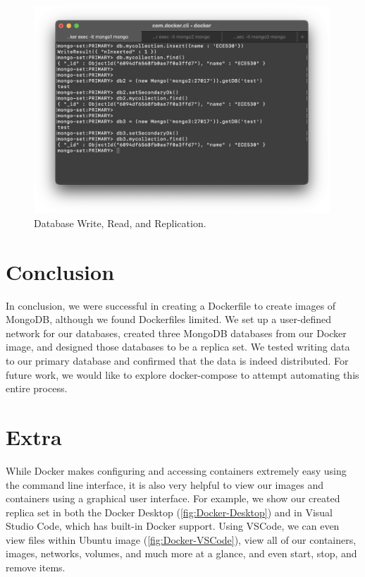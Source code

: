 \documentclass{article}
\begin{document}
\begin{figure}[ht]
    \centering
    \includegraphics[width=0.99\textwidth]{Docker-Write-Read.png}
    \vspace{-3em}\caption{Database Write, Read, and Replication.}
    \label{fig:Docker-Write-Read}
\end{figure}

\section{Conclusion}
In conclusion, we were successful in creating a Dockerfile to create images of MongoDB, although we found Dockerfiles limited. We set up a  user-defined network for our databases, created three MongoDB databases from our Docker image, and designed those databases to be a replica set. We tested writing data to our primary database and confirmed that the data is indeed distributed. For future work, we would like to explore docker-compose to attempt automating this entire process.

\section{Extra}
While Docker makes configuring and accessing containers extremely easy using the command line interface, it is also very helpful to view our images and containers using a graphical user interface. For example, we show our created replica set in both the Docker Desktop (\autoref{fig:Docker-Desktop}) and in Visual Studio Code, which has built-in Docker support. Using VSCode, we can even view files within Ubuntu image (\autoref{fig:Docker-VSCode}), view all of our containers, images, networks, volumes, and much more at a glance, and even start, stop, and remove items.
\end{document}
